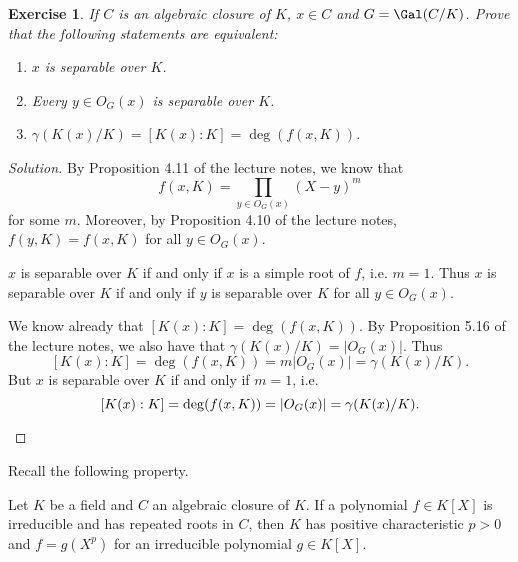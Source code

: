 \documentclass[a4paper,10pt,reqno]{amsart}
\newtheorem{ex}{Exercise}[section]
\newenvironment{sol}
  {\renewcommand\qedsymbol{$\blacksquare$}\begin{proof}[Solution]}
  {\end{proof}}
\begin{document}
\begin{ex}
\label{6.2}
   If $C$ is an algebraic closure of $K$, $x\in C$ and $G=\Gal(C/K)$. Prove that the following statements are equivalent:
   \begin{enumerate}[label=(\roman*)]
        \item $x$ is separable over $K$.
        \item Every $y\in O_G(x)$ is separable over $K$.
        \item $\gamma(K(x)/K)=[K(x):K]=\deg(f(x,K))$.
    \end{enumerate}
\end{ex}
\begin{sol}
By Proposition 4.11 of the lecture notes, we know that 
$$f(x,K)=\prod_{y\in O_G(x)} (X-y)^m$$
for some $m$.
Moreover, by Proposition 4.10 of the lecture notes,
$f(y,K)=f(x,K)$ for all $y\in O_G(x)$.
    \begin{description}[font=\normalfont]
        \item[(i)$\iff$(ii)] $x$ is separable over $K$ if and only if $x$ is a simple root of $f$, i.e. $m=1$.
        Thus $x$ is separable over $K$ if and only if $y$
        is separable over $K$ for all $y\in O_G(x)$.
        \item[(i)$\iff$(iii)] We know already that $[K(x):K]=\deg(f(x,K))$.
        By Proposition 5.16 of the lecture notes, we also have that $\gamma(K(x)/K)=|O_G(x)|$.
        Thus 
        $$[K(x):K]=\deg(f(x,K))=m|O_G(x)|=\gamma(K(x)/K).$$
        But $x$ is separable over $K$ if and only if $m=1$, i.e.
        \[
        [K(x):K]=\deg(f(x,K))=|O_G(x)|=\gamma(K(x)/K).\qedhere
        \]
    \end{description}
\end{sol}

Recall the following property.

\begin{pro}
    Let $K$ be a field and $C$ an algebraic closure of $K$. If a polynomial $f \in K[X]$ is irreducible and has repeated roots in $C$, then $K$ has positive characteristic $p > 0$ and  $f = g(X^p)$ for an irreducible polynomial $g \in K[X]$.
\end{pro}
\end{document}
